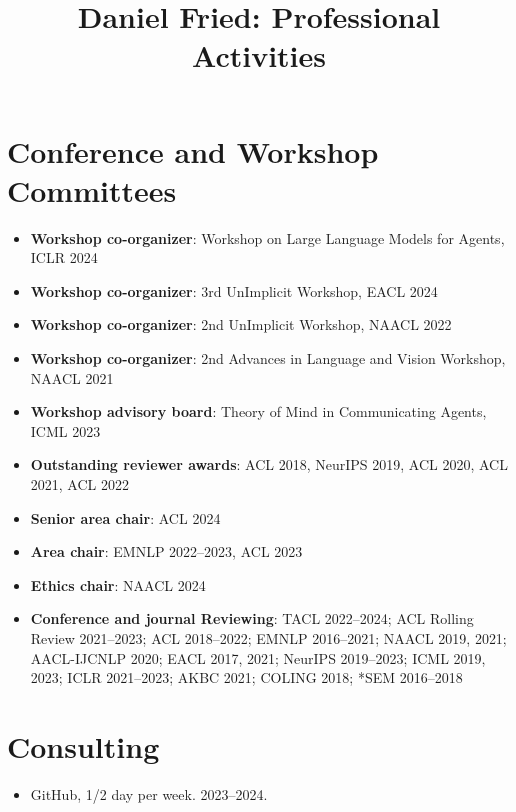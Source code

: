 \documentclass[11pt]{article}
\title{\vspace{-4em}Daniel Fried: Professional Activities\vspace{-0.5em}}
\date{}
\begin{document}
\maketitle

\section*{Conference and Workshop Committees}

\begin{itemize}
  \item \textbf{Workshop co-organizer}: Workshop on Large Language Models for Agents, ICLR 2024

  \item \textbf{Workshop co-organizer}: 3rd UnImplicit Workshop, EACL 2024

  \item \textbf{Workshop co-organizer}: 2nd UnImplicit Workshop, NAACL 2022

  \item \textbf{Workshop co-organizer}: 2nd Advances in Language and Vision Workshop, NAACL 2021

  \item \textbf{Workshop advisory board}: Theory of Mind in Communicating Agents, ICML 2023

  \item \textbf{Outstanding reviewer awards}: ACL 2018, NeurIPS 2019, ACL 2020, ACL 2021, ACL 2022

  \item \textbf{Senior area chair}: ACL 2024

  \item \textbf{Area chair}: EMNLP 2022--2023, ACL 2023

  \item \textbf{Ethics chair}: NAACL 2024

  \item \textbf{Conference and journal Reviewing}: TACL 2022--2024; ACL Rolling Review 2021--2023; ACL 2018--2022; EMNLP 2016--2021; NAACL 2019, 2021; AACL-IJCNLP 2020; EACL 2017, 2021; NeurIPS 2019--2023; ICML 2019, 2023; ICLR 2021--2023; AKBC 2021; COLING 2018; *SEM 2016--2018
\end{itemize}

\section*{Consulting}
\begin{itemize}
\item GitHub, 1/2 day per week. 2023--2024.
\end{itemize}
\end{document}
